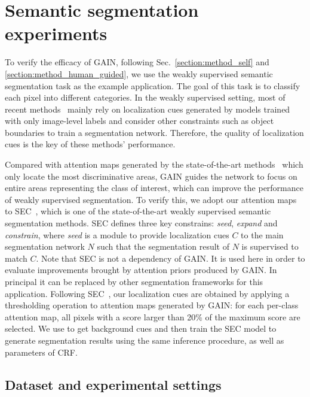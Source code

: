 \documentclass[10pt,twocolumn,letterpaper]{article}
\begin{document}
\section{Semantic segmentation experiments}\label{sc:seg_exp}

To verify the efficacy of GAIN, following Sec.~\ref{section:method_self} and \ref{section:method_human_guided}, we use the weakly supervised semantic segmentation task as the example application. The goal of this task is to classify each pixel into different categories. In the weakly supervised setting, most of recent methods~\cite{kolesnikov2016seed,kim2017two,wei2017object} mainly rely on localization cues generated by models trained with only image-level labels and consider other constraints such as object boundaries to train a segmentation network. Therefore, the quality of localization cues is the key of these methods' performance.

Compared with attention maps generated by the state-of-the-art methods~\cite{grad-cam,long2015fully,zhou2016learning} which only locate the most discriminative areas, GAIN guides the network to focus on entire areas representing the class of interest, which can improve the performance of weakly supervised segmentation. To verify this, we adopt our attention maps to SEC~\cite{kolesnikov2016seed}, which is one of the state-of-the-art weakly supervised semantic segmentation methods. SEC defines three key constrains: \emph{seed}, \emph{expand} and \emph{constrain}, where \emph{seed} is a module to provide localization cues $C$ to the main segmentation network $N$ such that the segmentation result of $N$ is supervised to match $C$. Note that SEC is not a dependency of GAIN. It is used here in order to evaluate improvements brought by attention priors produced by GAIN. In principal it can be replaced by other segmentation frameworks for this application. Following SEC~\cite{kolesnikov2016seed}, our localization cues are obtained by applying a thresholding operation to attention maps generated by GAIN: for each per-class attention map, all pixels with a score larger than 20\% of the maximum score are selected. We use \cite{liu2016dhsnet} to get background cues and then train the SEC model to generate segmentation results using the same inference procedure, as well as parameters of CRF\cite{CRFkrahenbuhl2011efficient}.

\subsection{Dataset and experimental settings}\label{sc:Experiment_setting}
\end{document}
